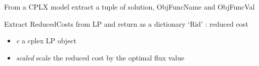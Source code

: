 \documentclass[a4paper,11pt,english]{sphinxmanual}
\begin{document}

\begin{fulllineitems}
\label{modules_doc:cbmpy.CBCPLEX.cplx_getOptimalSolution2}
From a CPLX model extract a tuple of solution, ObjFuncName and ObjFuncVal

\end{fulllineitems}


\begin{fulllineitems}
\label{modules_doc:cbmpy.CBCPLEX.cplx_getReducedCosts}
Extract ReducedCosts from LP and return as a dictionary `Rid' : reduced cost
\begin{itemize}
\item {} 
\emph{c} a cplex LP object

\item {} 
\emph{scaled} scale the reduced cost by the optimal flux value

\end{itemize}

\end{fulllineitems}

\end{document}
